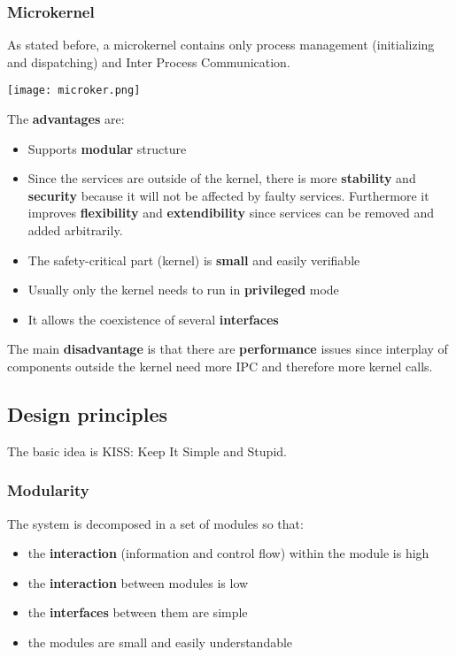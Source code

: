 \subsubsection{Microkernel}
As stated before, a microkernel contains only process management (initializing and dispatching) and Inter Process Communication.
\begin{center}
	\texttt{[image: microker.png]}
\end{center}
The \textbf{advantages} are:
\begin{itemize}
	\item Supports \textbf{modular} structure
	\item Since the services are outside of the kernel, there is more \textbf{stability} and \textbf{security} because it will not be affected by faulty services. Furthermore it improves \textbf{flexibility} and \textbf{extendibility} since services can be removed and added arbitrarily.
	\item The safety-critical part (kernel) is \textbf{small} and easily verifiable
	\item Usually only the kernel needs to run in \textbf{privileged} mode
	\item It allows the coexistence of several \textbf{interfaces} 
\end{itemize}
The main \textbf{disadvantage} is that there are \textbf{performance} issues since interplay of components outside the kernel need more IPC and therefore more kernel calls.

\subsection{Design principles}
The basic idea is KISS: Keep It Simple and Stupid.
\subsubsection{Modularity}
The system is decomposed in a set of modules so that:
\begin{itemize}
	\item the \textbf{interaction} (information and control flow) within the module is high
	\item the \textbf{interaction} between modules is low
	\item the \textbf{interfaces} between them are simple
	\item the modules are small and easily understandable
\end{itemize}


